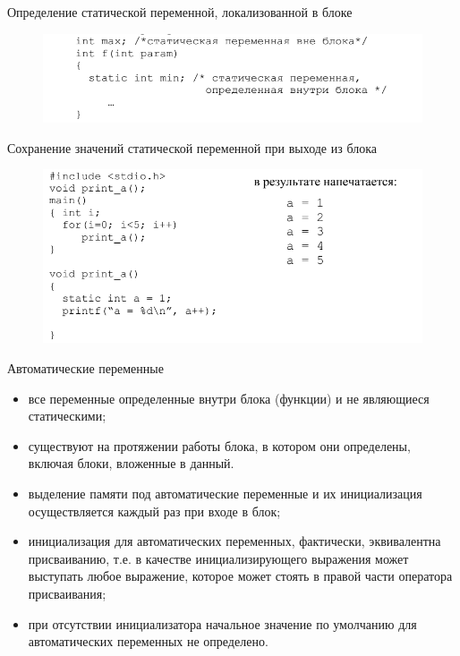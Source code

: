 \documentclass{beamer}
\begin{document}
\begin{frame}
Определение статической переменной, локализованной в блоке
\begin{figure}[h]
\centering
\includegraphics[scale=0.5]{images/lec03-pic10.png}
\end{figure}
\end{frame}

\begin{frame}
Сохранение значений статической переменной при выходе из блока
\begin{figure}[h]
\centering
\includegraphics[scale=0.5]{images/lec03-pic11.png}
\end{figure}
\end{frame}

\begin{frame}
Автоматические переменные
\begin{itemize}
\item все переменные определенные внутри блока (функции) и не являющиеся статическими;
\item существуют на протяжении работы блока, в котором они определены, включая блоки, вложенные в данный. 
\item выделение памяти под автоматические переменные и их инициализация осуществляется каждый раз при входе в блок;
\item инициализация для автоматических переменных, фактически, эквивалентна
присваиванию, т.е. в качестве инициализирующего выражения может выступать любое выражение, которое может стоять в правой части оператора присваивания;
\item при отсутствии инициализатора начальное значение по умолчанию для автоматических переменных не определено.
\end{itemize}
\end{frame}
\end{document}
